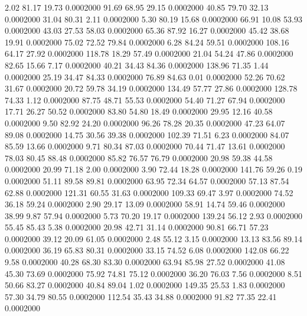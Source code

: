    2.02   81.17   19.73   0.0002000
  91.69   68.95   29.15   0.0002000
  40.85   79.70   32.13   0.0002000
  31.04   80.31    2.11   0.0002000
   5.30   80.19   15.68   0.0002000
  66.91   10.08   53.93   0.0002000
  43.03   27.53   58.03   0.0002000
  65.36   87.92   16.27   0.0002000
  45.42   38.68   19.91   0.0002000
  75.02   72.52   79.84   0.0002000
   6.28   84.24   59.51   0.0002000
 108.16   64.17   27.92   0.0002000
 118.78   18.29   57.49   0.0002000
  21.04   54.24   47.86   0.0002000
  82.65   15.66    7.17   0.0002000
  40.21   34.43   84.36   0.0002000
 138.96   71.35    1.44   0.0002000
  25.19   34.47   84.33   0.0002000
  76.89   84.63    0.01   0.0002000
  52.26   70.62   31.67   0.0002000
  20.72   59.78   34.19   0.0002000
 134.49   57.77   27.86   0.0002000
 128.78   74.33    1.12   0.0002000
  87.75   48.71   55.53   0.0002000
  54.40   71.27   67.94   0.0002000
  17.71   26.27   50.52   0.0002000
  83.80   54.80   18.49   0.0002000
  29.95   12.16   40.58   0.0002000
   9.50   82.92   24.20   0.0002000
  96.26   78.28   20.35   0.0002000
  47.23   64.07   89.08   0.0002000
  14.75   30.56   39.38   0.0002000
 102.39   71.51    6.23   0.0002000
  84.07   85.59   13.66   0.0002000
   9.71   80.34   87.03   0.0002000
  70.44   71.47   13.61   0.0002000
  78.03   80.45   88.48   0.0002000
  85.82   76.57   76.79   0.0002000
  20.98   59.38   44.58   0.0002000
  20.99   71.18    2.00   0.0002000
   3.90   72.44   18.28   0.0002000
 141.76   59.26    0.19   0.0002000
  51.11   89.58   89.81   0.0002000
  63.95   72.34   64.57   0.0002000
  57.13   87.54   62.88   0.0002000
 121.31   60.55   31.63   0.0002000
 109.33   69.47    3.97   0.0002000
  74.52   36.18   59.24   0.0002000
   2.90   29.17   13.09   0.0002000
  58.91   14.74   59.46   0.0002000
  38.99    9.87   57.94   0.0002000
   5.73   70.20   19.17   0.0002000
 139.24   56.12    2.93   0.0002000
  55.45   85.43    5.38   0.0002000
  20.98   42.71   31.14   0.0002000
  90.81   66.71   57.23   0.0002000
  39.12   20.09   61.05   0.0002000
   2.48   55.12    3.15   0.0002000
  13.13   83.56   89.14   0.0002000
  36.19   65.83   80.31   0.0002000
  33.15   74.52    6.08   0.0002000
 142.08   66.22    9.58   0.0002000
  40.28   68.30   83.30   0.0002000
  63.94   85.98   27.52   0.0002000
  41.08   45.30   73.69   0.0002000
  75.92   74.81   75.12   0.0002000
  36.20   76.03    7.56   0.0002000
   8.51   50.66   83.27   0.0002000
  40.84   89.04    1.02   0.0002000
 149.35   25.53    1.83   0.0002000
  57.30   34.79   80.55   0.0002000
 112.54   35.43   34.88   0.0002000
  91.82   77.35   22.41   0.0002000
